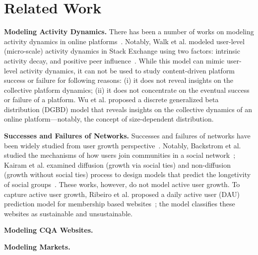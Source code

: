 \section{Related Work}
\textbf{Modeling Activity Dynamics.} There has been a number of works on modeling activity dynamics in online platforms~\cite{wu2011, anderson2012, walk2016}. Notably, Walk et al. modeled user-level (micro-scale) activity dynamics in Stack Exchange using two factors: intrinsic activity decay, and positive peer influence~\cite{walk2016}. While this model can mimic user-level activity dynamics, it can not be used to study content-driven platform success or failure for following reasons: (i) it does not reveal insights on the collective platform dynamics; (ii) it does not concentrate on the eventual success or failure of a platform. Wu et al. proposed a discrete generalized beta distribution (DGBD) model that reveals insights on the collective dynamics of an online platform---notably, the concept of size-dependent distribution.

\textbf{Successes and Failures of Networks.} Successes and failures of networks have been widely studied from user growth perspective~\cite{Kumar2006, Backstrom2006, kairam2012, zang2016}. Notably, Backstrom et al. studied the mechanisms of how users join communities in a social network~\cite{Backstrom2006};  Kairam et al. examined diffusion (growth via social ties) and non-diffusion (growth without social ties) process to design models that predict the longetivity of social groups~\cite{kairam2012}. These works, however, do not model active user growth. To capture active user growth, Ribeiro et al. proposed a daily active user (DAU) prediction model for membership based websites~\cite{Ribeiro2014}; the model classifies these websites as sustainable and unsustainable.

\textbf{Modeling CQA Websites.} 



\textbf{Modeling Markets.} 

